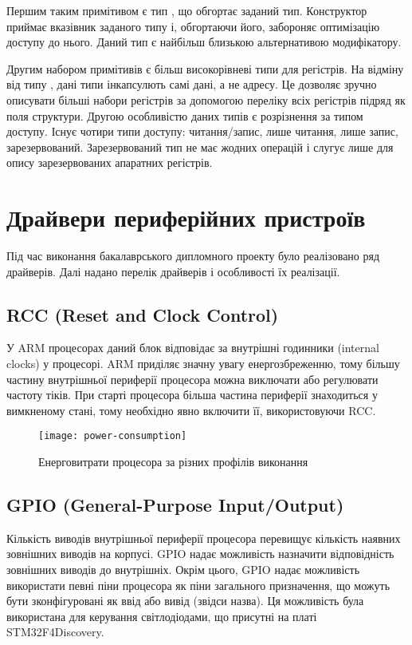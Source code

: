 \documentclass[main.tex]{subfiles}
\begin{document}
Першим таким примітивом є тип , що обгортає заданий тип. Конструктор приймає вказівник заданого типу і, обгортаючи його, забороняє оптимізацію доступу до нього. Даний тип є найбільш близькою альтернативою  модифікатору.

Другим набором примітивів є більш високорівневі типи для регістрів. На відміну від типу , дані типи інкапсулють самі дані, а не адресу. Це дозволяє зручно описувати більші набори регістрів за допомогою переліку всіх регістрів підряд як поля структури. Другою особливістю даних типів є розрізнення за типом доступу. Існує чотири типи доступу: читання/запис, лише читання, лише запис, зарезервований. Зарезервований тип не має жодних операцій і слугує лише для опису зарезервованих апаратних регістрів.

\section{Драйвери периферійних пристроїв}

Під час виконання бакалаврського дипломного проекту було реалізовано ряд драйверів. Далі надано перелік драйверів і особливості їх реалізації.

\subsection{RCC (Reset and Clock Control)}

  У ARM процесорах даний блок відповідає за внутрішні годинники (internal clocks) у процесорі. ARM приділяє значну увагу енергозбреженню, тому більшу частину внутрішньої периферії процесора можна виключати або регулювати частоту тіків. При старті процесора більша частина периферії знаходиться у вимкненому стані, тому необхідно явно включити її, використовуючи RCC.

\begin{figure}[h]
  \texttt{[image: power-consumption]}
  \caption{Енерговитрати процесора за різних профілів виконання}
\end{figure}

\subsection{GPIO (General-Purpose Input/Output)}

  Кількість виводів внутрішньої периферії процесора перевищує кількість наявних зовнішних виводів на корпусі. GPIO надає можливість назначити відповідність зовнішних виводів до внутрішніх. Окрім цього, GPIO надає можливість використати певні піни процесора як піни загального призначення, що можуть бути зконфігуровані як ввід або вивід (звідси назва). Ця можливість була використана для керування світлодіодами, що присутні на платі STM32F4Discovery.
\end{document}
